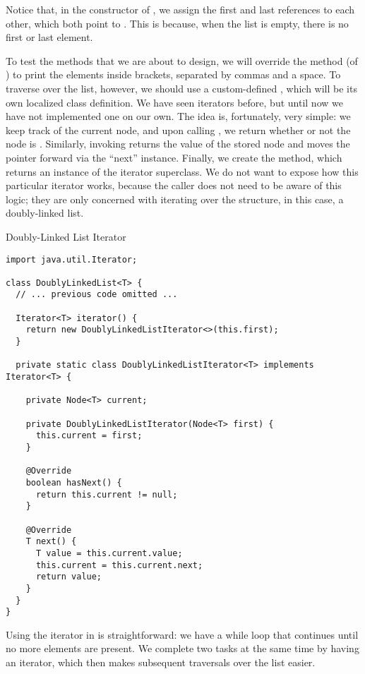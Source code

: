 Notice that, in the constructor of , we assign the first and last references to each other, which both point to . This is because, when the list is empty, there is no first or last element.

To test the methods that we are about to design, we will override the  method (of ) to print the elements inside brackets, separated by commas and a space. To traverse over the list, however, we should use a custom-defined , which will be its own localized class definition. We have seen iterators before, but until now we have not implemented one on our own. The idea is, fortunately, very simple: we keep track of the current node, and upon calling , we return whether or not the node is . Similarly, invoking  returns the value of the stored node and moves the pointer forward via the ``next'' instance. Finally, we create the  method, which returns an instance of the iterator superclass. We do not want to expose how this particular iterator works, because the caller does not need to be aware of this logic; they are only concerned with iterating over the structure, in this case, a doubly-linked list.

\begin{cl}[]{Doubly-Linked List Iterator}
\begin{lstlisting}[language=MyJava]
import java.util.Iterator;

class DoublyLinkedList<T> {
  // ... previous code omitted ...

  Iterator<T> iterator() {
    return new DoublyLinkedListIterator<>(this.first);
  }

  private static class DoublyLinkedListIterator<T> implements Iterator<T> {
    
    private Node<T> current;

    private DoublyLinkedListIterator(Node<T> first) {
      this.current = first;
    }

    @Override
    boolean hasNext() { 
      return this.current != null; 
    }

    @Override
    T next() {
      T value = this.current.value;
      this.current = this.current.next;
      return value;
    }
  }
}
\end{lstlisting}
\end{cl}

Using the iterator in  is straightforward: we have a while loop that continues until no more elements are present. We complete two tasks at the same time by having an iterator, which then makes subsequent traversals over the list easier.

